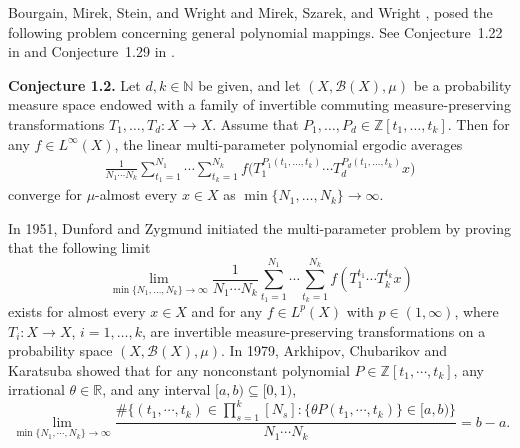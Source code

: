 \documentclass[11 pt,letterpaper]{amsart}
\theoremstyle{plain}
\theoremstyle{definition}
\theoremstyle{remark} \theoremstyle{exam} \theoremstyle{ob}
\numberwithin{equation}{section}
\begin{document}
 
Bourgain, Mirek, Stein, and Wright \cite{B4} and Mirek, Szarek, and Wright \cite{MSW1}, posed the following problem concerning general polynomial mappings. See Conjecture~1.22 in \cite{B4} and Conjecture~1.29 in \cite{MSW1}.


\medskip
\noindent
\textbf{Conjecture 1.2.}
Let $d,k\in\mathbb{N}$ be given, and let $(X,\mathcal{B}(X),\mu)$ be a probability measure space endowed with a family of invertible commuting measure-preserving transformations $T_1,\dots,T_d:X\to X$. Assume that $P_1,\dots,P_d\in\mathbb{Z}[t_1,\dots,t_k]$. Then for any $f\in L^\infty(X)$, the linear multi-parameter polynomial ergodic averages
\begin{align*}
	\frac{1}{N_1\cdots N_k}
\sum_{t_1=1}^{N_1}\cdots\sum_{t_k=1}^{N_k}
	f\bigl(T_1^{P_1(t_1,\dots,t_k)}\cdots T_d^{P_d(t_1,\dots,t_k)}x\bigr)
\end{align*}
converge for $\mu$-almost every $x\in X$ as $\min\{N_1,\dots,N_k\}\to\infty$.

\medskip


In 1951, Dunford  \cite{Dun} and Zygmund \cite{Zyg}  initiated the  multi-parameter problem by proving that the following limit
$$
\lim_{\min\{N_1,\dots,N_k\}\to\infty}	\frac{1}{N_1\cdots N_k}
\sum_{t_1=1}^{N_1}\cdots\sum_{t_k=1}^{N_k} f(T_1^{t_1} \cdots T_k^{t_k} x)
$$
exists for almost every $x \in X$ and for any $f \in L^p(X)$ with $p \in(1, \infty)$, where $T_i:X\to X$, $i=1,\ldots,k$, are invertible measure-preserving transformations  on a probability space $(X, \mathcal{B}(X), \mu)$.  In 1979, Arkhipov, Chubarikov and Karatsuba \cite{AC}  showed that for any nonconstant polynomial $P \in \mathbb{Z}[t_1, \cdots, t_{k}]$, any irrational $\theta \in \mathbb{R}$, and any interval $[a, b) \subseteq[0,1)$,
$$\lim _{\min \{N_1, \cdots, N_k\} \rightarrow \infty} \frac{\#\{(t_1, \cdots, t_k) \in \prod_{s=1}^{k}[N_s]:\{\theta P(t_1, \cdots, t_k)\} \in[a, b)\}}{N_1 \cdots N_k}=b-a.$$ 
\end{document}
